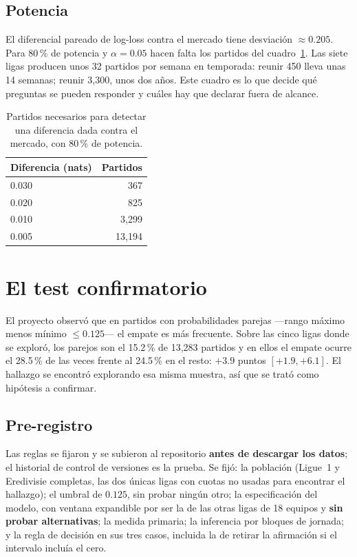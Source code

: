 \documentclass{pas}
\begin{document}
\subsection{Potencia}
El diferencial pareado de log-loss contra el mercado tiene desviación $\approx 0.205$. Para 80\,\% de potencia y
$\alpha = 0.05$ hacen falta los partidos del cuadro~\ref{tab:potencia}. Las siete ligas producen unos 32 partidos
por semana en temporada: reunir 450 lleva unas 14 semanas; reunir 3{,}300, unos dos años. Este cuadro es lo que
decide qué preguntas se pueden responder y cuáles hay que declarar fuera de alcance.

\begin{table}[t]
\caption{Partidos necesarios para detectar una diferencia dada contra el mercado, con 80\,\% de potencia.}
\label{tab:potencia}
\centering
\begin{tabular}{lr}
\hline
Diferencia (nats) & Partidos \\
\hline
0.030 & 367 \\
0.020 & 825 \\
0.010 & 3{,}299 \\
0.005 & 13{,}194 \\
\hline
\end{tabular}
\end{table}

\section{El test confirmatorio}
\label{sec:test}

El proyecto observó que en partidos con probabilidades parejas —rango máximo menos mínimo $\le 0.125$— el empate es
más frecuente. Sobre las cinco ligas donde se exploró, los parejos son el 15.2\,\% de 13{,}283 partidos y en ellos
el empate ocurre el 28.5\,\% de las veces frente al 24.5\,\% en el resto: $+3.9$ puntos $[+1.9, +6.1]$. El hallazgo
se encontró explorando esa misma muestra, así que se trató como hipótesis a confirmar.

\subsection{Pre-registro}
Las reglas se fijaron y se subieron al repositorio \textbf{antes de descargar los datos}; el historial de control de
versiones es la prueba. Se fijó: la población (Ligue~1 y Eredivisie completas, las dos únicas ligas con cuotas no
usadas para encontrar el hallazgo); el umbral de $0.125$, sin probar ningún otro; la especificación del modelo, con
ventana expandible por ser la de las otras ligas de 18 equipos y \textbf{sin probar alternativas}; la medida
primaria; la inferencia por bloques de jornada; y la regla de decisión en sus tres casos, incluida la de retirar la
afirmación si el intervalo incluía el cero.
\end{document}
